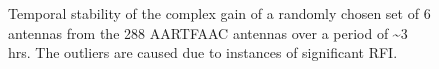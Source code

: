 \documentclass{aa}
\begin{document}
\begin{figure}[tbh]
\caption{\label{fig:gain-Temporal-stability}Temporal  stability  of the  complex
  gain of  a randomly chosen  set of 6  antennas from the 288  AARTFAAC antennas
  over  a  period  of \textasciitilde3  hrs.  The  outliers  are caused  due  to
  instances of significant RFI.}
\end{figure}
\end{document}
